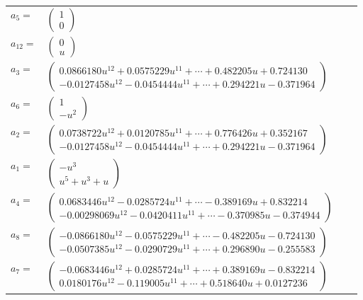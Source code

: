\documentclass[1p]{elsarticle_modified}
\theoremstyle{definition}
\begin{document}
\begin{tabular}{m{7pt} m{180pt} m{7pt} m{180pt} }
\flushright $a_{5}=$&$\begin{pmatrix}1\\0\end{pmatrix}$ \\
\flushright $a_{12}=$&$\begin{pmatrix}0\\u\end{pmatrix}$ \\
\flushright $a_{3}=$&$\begin{pmatrix}0.0866180 u^{12}+0.0575229 u^{11}+\cdots+0.482205 u+0.724130\\-0.0127458 u^{12}-0.0454444 u^{11}+\cdots+0.294221 u-0.371964\end{pmatrix}$ \\
\flushright $a_{6}=$&$\begin{pmatrix}1\\- u^2\end{pmatrix}$ \\
\flushright $a_{2}=$&$\begin{pmatrix}0.0738722 u^{12}+0.0120785 u^{11}+\cdots+0.776426 u+0.352167\\-0.0127458 u^{12}-0.0454444 u^{11}+\cdots+0.294221 u-0.371964\end{pmatrix}$ \\
\flushright $a_{1}=$&$\begin{pmatrix}- u^3\\u^5+u^3+u\end{pmatrix}$ \\
\flushright $a_{4}=$&$\begin{pmatrix}0.0683446 u^{12}-0.0285724 u^{11}+\cdots-0.389169 u+0.832214\\-0.00298069 u^{12}-0.0420411 u^{11}+\cdots-0.370985 u-0.374944\end{pmatrix}$ \\
\flushright $a_{8}=$&$\begin{pmatrix}-0.0866180 u^{12}-0.0575229 u^{11}+\cdots-0.482205 u-0.724130\\-0.0507385 u^{12}-0.0290729 u^{11}+\cdots+0.296890 u-0.255583\end{pmatrix}$ \\
\flushright $a_{7}=$&$\begin{pmatrix}-0.0683446 u^{12}+0.0285724 u^{11}+\cdots+0.389169 u-0.832214\\0.0180176 u^{12}-0.119005 u^{11}+\cdots+0.518640 u+0.0127236\end{pmatrix}$ \\

\end{tabular}
\end{document}
